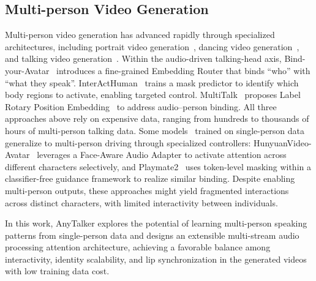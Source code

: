 \subsection{Multi-person Video Generation} Multi-person video generation has advanced rapidly through specialized architectures, including portrait video generation~\cite{wang2025fantasyportrait, meng2025identity}, dancing video generation~\cite{xuetowards}, and talking video generation~\cite{huang2025bind, kong2025let, wang2025interacthuman}. 
Within the audio-driven talking-head axis, Bind-your-Avatar~\cite{huang2025bind} introduces a fine-grained Embedding Router that binds ``who” with ``what they speak”. InterActHuman~\cite{wang2025interacthuman} trains a mask predictor to identify which body regions to activate, enabling targeted control. 
MultiTalk~\cite{kong2025let} proposes Label Rotary Position Embedding~\cite{su2024roformer} to address audio–person binding. 
All three approaches above rely on expensive data, ranging from hundreds to thousands of hours of multi-person talking data. 
Some models~\cite{chen2025hunyuanvideo, ma2025playmate2} trained on single-person data generalize to multi-person driving through specialized controllers: HunyuanVideo-Avatar~\cite{chen2025hunyuanvideo} leverages a Face-Aware Audio Adapter to activate attention across different characters selectively, and Playmate2~\cite{ma2025playmate2} uses token-level masking within a classifier-free guidance framework to realize similar binding. 
Despite enabling multi-person outputs, these approaches might yield fragmented interactions across distinct characters, with limited interactivity between individuals.

In this work, AnyTalker explores the potential of learning multi-person speaking patterns from single-person data and designs an extensible multi-stream audio processing attention architecture, achieving a favorable balance among interactivity, identity scalability, and lip synchronization in the generated videos with low training data cost. 

